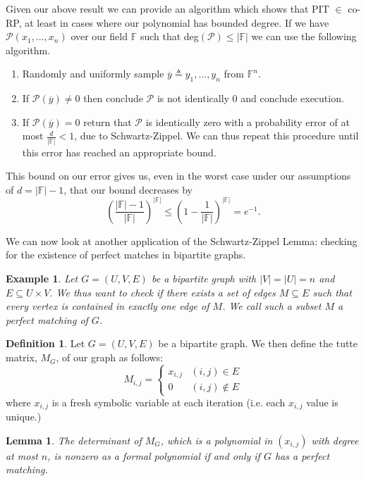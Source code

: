 \documentclass[11pt]{article}
\newtheorem{lemma}[theorem]{Lemma}
\newtheorem*{example*}{Example}
\theoremstyle{definition}
\newtheorem{definition}[theorem]{Definition}
\numberwithin{equation}{subsection}
\begin{document}
Given our above result we can provide an algorithm which shows that PIT $\in$ co-RP, at least in cases where our polynomial has bounded degree. If we have $\mathcal{P}(x_1,\ldots,x_n)$ over our field $\mathbb{F}$ such that deg$(\mathcal{P})\leq |\mathbb{F}|$ we can use the following algorithm.
\begin{enumerate}
\item Randomly and uniformly sample $\overline{y}\triangleq y_1,\ldots,y_n$ from $\mathbb{F}^n$.
\item If $\mathcal{P}(\overline{y})\neq 0$ then conclude $\mathcal{P}$ is not identically $0$ and conclude execution.
\item If $\mathcal{P}(\overline{y})=0$ return that $\mathcal{P}$ is identically zero with a probability error of at most $\frac{d}{|\mathbb{F}|}<1$, due to Schwartz-Zippel. We can thus repeat this procedure until this error has reached an appropriate bound.
\end{enumerate} 

This bound on our error gives us, even in the worst case under our assumptions of $d=|\mathbb{F}|-1$, that our bound decreases by $$\left(\frac{|\mathbb{F}|-1}{|\mathbb{F}|}\right)^{|\mathbb{F}|}\leq \left(1-\frac{1}{|\mathbb{F}|}\right)^{|\mathbb{F}|}=e^{-1}.$$ 

We can now look at another application of the Schwartz-Zippel Lemma: checking for the existence of perfect matches in bipartite graphs. \cite{Tutte}

\begin{example*}
Let $G=(U,V,E)$ be a bipartite graph with $|V|=|U|=n$ and $E\subseteq U\times V$. We thus want to check if there exists a set of edges $M\subseteq E$ such that every vertex is contained in exactly one edge of $M$. We call such a subset $M$ a perfect matching of $G$.
\end{example*}

\begin{definition}
Let $G=(U,V,E)$ be a bipartite graph. We then define the tutte matrix, $M_G$, of our graph as follows: 
\[ M_{i,j}=\begin{cases} 
      x_{i,j} & (i,j)\in E \\
      0 & (i,j)\not\in E
   \end{cases}
\] where $x_{i,j}$ is a fresh symbolic variable at each iteration (i.e. each $x_{i,j}$ value is unique.)
\end{definition}

\begin{lemma}
The determinant of $M_G$, which is a polynomial in $(x_{i,j})$ with degree at most $n$, is nonzero as a formal polynomial if and only if $G$ has a perfect matching.
\end{lemma}
\end{document}
